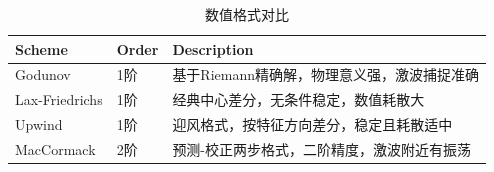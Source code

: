 \begin{table}
\caption{数值格式对比}
\label{tab:schemes}
\begin{tabular}{lll}
\toprule
Scheme & Order & Description \\
\midrule
Godunov & 1阶 & 基于Riemann精确解，物理意义强，激波捕捉准确 \\
Lax-Friedrichs & 1阶 & 经典中心差分，无条件稳定，数值耗散大 \\
Upwind & 1阶 & 迎风格式，按特征方向差分，稳定且耗散适中 \\
MacCormack & 2阶 & 预测-校正两步格式，二阶精度，激波附近有振荡 \\
\bottomrule
\end{tabular}
\end{table}
